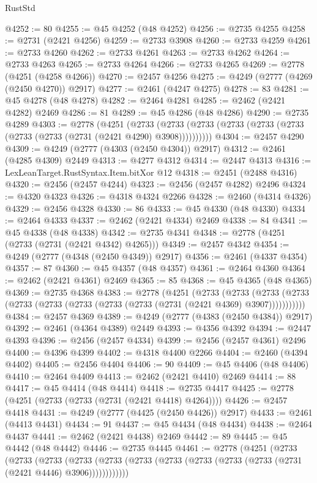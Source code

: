\begin{lexlean}{RustStd}
\begin{coremodule}
@4252 := 80
@4255 := @45 @4252 (@48 @4252)
@4256 := @2735 @4255
@4258 := @2731 (@2421 @4256)
@4259 := @2733 @3908
@4260 := @2733 @4259
@4261 := @2733 @4260
@4262 := @2733 @4261
@4263 := @2733 @4262
@4264 := @2733 @4263
@4265 := @2733 @4264
@4266 := @2733 @4265
@4269 := @2778 (@4251 (@4258 @4266))
@4270 := @2457 @4256
@4275 := @4249 (@2777 (@4269 (@2450 @4270)) @2917)
@4277 := @2461 (@4247 @4275)
@4278 := 83
@4281 := @45 @4278 (@48 @4278)
@4282 := @2464 @4281
@4285 := @2462 (@2421 @4282) @2469
@4286 := 81
@4289 := @45 @4286 (@48 @4286)
@4290 := @2735 @4289
@4303 := @2778
    (@4251
      (@2733 (@2733 (@2733 (@2733 (@2733 (@2733 (@2733 (@2733 (@2731 (@2421 @4290) @3908))))))))))
@4304 := @2457 @4290
@4309 := @4249 (@2777 (@4303 (@2450 @4304)) @2917)
@4312 := @2461 (@4285 @4309) @2449
@4313 := @4277 @4312
@4314 := @2447 @4313
@4316 := LexLeanTarget.RustSyntax.Item.bitXor @12
@4318 := @2451 (@2488 @4316)
@4320 := @2456 (@2457 @4244)
@4323 := @2456 (@2457 @4282) @2496
@4324 := @4320 @4323
@4326 := @4318 @4324 @2266
@4328 := @2460 (@4314 @4326)
@4329 := @2456 @4328
@4330 := 86
@4333 := @45 @4330 (@48 @4330)
@4334 := @2464 @4333
@4337 := @2462 (@2421 @4334) @2469
@4338 := 84
@4341 := @45 @4338 (@48 @4338)
@4342 := @2735 @4341
@4348 := @2778 (@4251 (@2733 (@2731 (@2421 @4342) @4265)))
@4349 := @2457 @4342
@4354 := @4249 (@2777 (@4348 (@2450 @4349)) @2917)
@4356 := @2461 (@4337 @4354)
@4357 := 87
@4360 := @45 @4357 (@48 @4357)
@4361 := @2464 @4360
@4364 := @2462 (@2421 @4361) @2469
@4365 := 85
@4368 := @45 @4365 (@48 @4365)
@4369 := @2735 @4368
@4383 := @2778
    (@4251
      (@2733
        (@2733
          (@2733 (@2733 (@2733 (@2733 (@2733 (@2733 (@2733 (@2731 (@2421 @4369) @3907)))))))))))
@4384 := @2457 @4369
@4389 := @4249 (@2777 (@4383 (@2450 @4384)) @2917)
@4392 := @2461 (@4364 @4389) @2449
@4393 := @4356 @4392
@4394 := @2447 @4393
@4396 := @2456 (@2457 @4334)
@4399 := @2456 (@2457 @4361) @2496
@4400 := @4396 @4399
@4402 := @4318 @4400 @2266
@4404 := @2460 (@4394 @4402)
@4405 := @2456 @4404
@4406 := 90
@4409 := @45 @4406 (@48 @4406)
@4410 := @2464 @4409
@4413 := @2462 (@2421 @4410) @2469
@4414 := 88
@4417 := @45 @4414 (@48 @4414)
@4418 := @2735 @4417
@4425 := @2778 (@4251 (@2733 (@2733 (@2731 (@2421 @4418) @4264))))
@4426 := @2457 @4418
@4431 := @4249 (@2777 (@4425 (@2450 @4426)) @2917)
@4433 := @2461 (@4413 @4431)
@4434 := 91
@4437 := @45 @4434 (@48 @4434)
@4438 := @2464 @4437
@4441 := @2462 (@2421 @4438) @2469
@4442 := 89
@4445 := @45 @4442 (@48 @4442)
@4446 := @2735 @4445
@4461 := @2778
    (@4251
      (@2733
        (@2733
          (@2733
            (@2733 (@2733 (@2733 (@2733 (@2733 (@2733 (@2733 (@2731 (@2421 @4446) @3906))))))))))))

\end{coremodule}
\end{lexlean}
